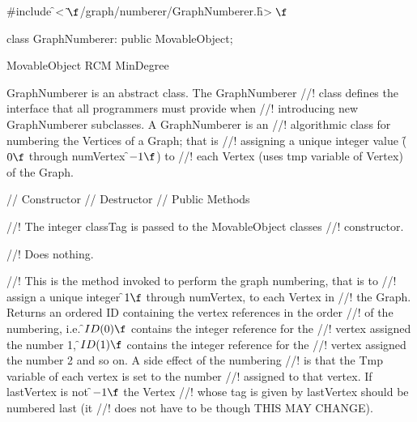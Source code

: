 

\indent \#include \f$<\tilde{ }\f$/graph/numberer/GraphNumberer.h\f$>\f$

\indent class GraphNumberer: public MovableObject;

\indent MovableObject
\indent{}
\indent\indent\indent RCM
\indent\indent\indent MinDegree

\indent GraphNumberer is an abstract class. The GraphNumberer
//! class defines the interface that all programmers must provide when
//! introducing new GraphNumberer subclasses. A GraphNumberer is an
//! algorithmic class for numbering the Vertices of a Graph; that is
//! assigning a unique integer value (\f$0\f$ through \p numVertex \f$-1\f$) to
//! each Vertex (uses \p tmp variable of Vertex) of the Graph.


\indent // Constructor
\indent // Destructor
\indent // Public Methods


//! The integer \p classTag is passed to the MovableObject classes
//! constructor. 

//! Does nothing.

//! This is the method invoked to perform the graph numbering, that is to
//! assign a unique integer \f$1\f$ through \p numVertex, to each Vertex in
//! the Graph. Returns an ordered ID containing the vertex references in the order
//! of the numbering, i.e. \f$ID(0)\f$ contains the integer reference for the
//! vertex assigned the number 1, \f$ID(1)\f$ contains the integer reference for the
//! vertex assigned the number 2 and so on. A side effect of the numbering
//! is that the \p Tmp variable of each vertex is set to the number
//! assigned to that vertex. If \p lastVertex is not \f$-1\f$ the Vertex
//! whose tag is given by \p lastVertex should be numbered last (it
//! does not have to be though THIS MAY CHANGE).

